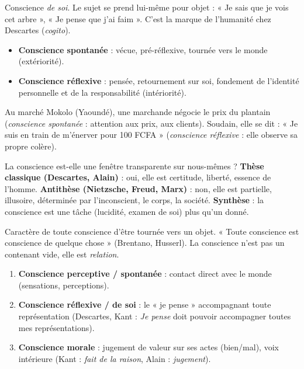 \documentclass[11pt]{article}
\newcommand{\cle}[1]{{\popxbold\color{popdark}#1}}
\newcounter{popsec}
\newcounter{popsub}
\newcommand{\courssub}[1]{%
  \stepcounter{popsub}%
  \par\vspace{9pt}\noindent{\popxbold\fontsize{11.5}{13}\selectfont\color{popink}{\color{poporange}\thepopsec.\thepopsub}\hspace{6pt}#1}\par\nopagebreak\vspace{4pt}
}
\begin{document}
\begin{definition}
Conscience \emph{de soi}. Le sujet se prend lui-même pour objet : « Je sais que je vois cet arbre », « Je pense que j'ai faim ». C'est la marque de l'humanité chez Descartes (\emph{cogito}).
\end{definition}

\begin{aretenir}
\begin{itemize}
\item \textbf{Conscience spontanée} : vécue, pré-réflexive, tournée vers le monde (extériorité).
\item \textbf{Conscience réflexive} : pensée, retournement sur soi, fondement de l'identité personnelle et de la responsabilité (intériorité).
\end{itemize}
\end{aretenir}

\begin{exemplebox}
Au marché Mokolo (Yaoundé), une marchande négocie le prix du plantain (\emph{conscience spontanée} : attention aux prix, aux clients). Soudain, elle se dit : « Je suis en train de m'énerver pour 100 FCFA » (\emph{conscience réflexive} : elle observe sa propre colère).
\end{exemplebox}

\begin{propriete}
La conscience est-elle une fenêtre transparente sur nous-mêmes ? \textbf{Thèse classique (Descartes, Alain)} : oui, elle est certitude, liberté, essence de l'homme. \textbf{Antithèse (Nietzsche, Freud, Marx)} : non, elle est partielle, illusoire, déterminée par l'inconscient, le corps, la société. \textbf{Synthèse} : la conscience est une \cle{tâche} (lucidité, examen de soi) plus qu'un donné.
\end{propriete}

\courssub{Nature de la conscience}

\begin{definition}[Intentionalité]
Caractère de toute conscience d'être tournée vers un objet. « Toute conscience est conscience de quelque chose » (Brentano, Husserl). La conscience n'est pas un contenant vide, elle est \emph{relation}.
\end{definition}

\begin{aretenir}
\begin{enumerate}
\item \textbf{Conscience perceptive / spontanée} : contact direct avec le monde (sensations, perceptions).
\item \textbf{Conscience réflexive / de soi} : le « je pense » accompagnant toute représentation (Descartes, Kant : \emph{Je pense} doit pouvoir accompagner toutes mes représentations).
\item \textbf{Conscience morale} : jugement de valeur sur ses actes (bien/mal), voix intérieure (Kant : \emph{fait de la raison}, Alain : \emph{jugement}).
\end{enumerate}
\end{aretenir}
\end{document}
